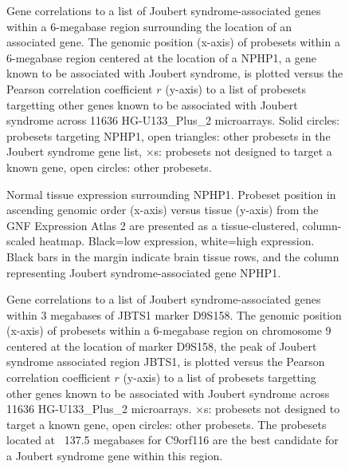 \documentclass{bioinfo}
\begin{document}

\begin{figure}[!tpb]
\label{figure:NPHP1}
\centerline{}
\caption{Gene correlations to a list of Joubert syndrome-associated genes within a
6-megabase region surrounding the location of an associated gene.  The genomic
position (x-axis) of probesets within a 6-megabase region centered at the
location of a NPHP1, a gene known to be associated with Joubert syndrome, is
plotted versus the Pearson correlation coefficient $r$ (y-axis) to a list of
probesets targetting other genes known to be associated with Joubert syndrome
across 11636 HG-U133\_Plus\_2 microarrays.  Solid circles: probesets targeting
NPHP1, open triangles: other probesets in the Joubert syndrome gene list,
$\times$s: probesets not designed to target a known gene, open circles: other
probesets.}
\end{figure}


\begin{figure}[!tpb]
\label{figure:GeneAtlas}
\centerline{}
\caption{Normal tissue expression surrounding NPHP1.  Probeset position in
ascending genomic order (x-axis) versus tissue (y-axis) from the GNF Expression
Atlas 2 are presented as a tissue-clustered, column-scaled heatmap.  Black=low
expression, white=high expression.  Black bars in the margin indicate brain
tissue rows, and the column representing Joubert syndrome-associated gene
NPHP1.}
\end{figure}


\begin{figure}[!tpb]
\label{figure:JBTS1}
\centerline{}
\caption{Gene correlations to a list of Joubert syndrome-associated genes within 3
megabases of JBTS1 marker D9S158.  The genomic position (x-axis) of probesets
within a 6-megabase region on chromosome 9 centered at the location of marker D9S158, the peak
of Joubert syndrome associated region JBTS1, is plotted versus the Pearson
correlation coefficient $r$ (y-axis) to a list of probesets targetting other
genes known to be associated with Joubert syndrome across 11636
HG-U133\_Plus\_2 microarrays.  $\times$s: probesets not designed to target a
known gene, open circles: other probesets.  The probesets located at ~137.5
megabases for C9orf116 are the best candidate for a Joubert syndrome gene
within this region.}
\end{figure}
\end{document}
